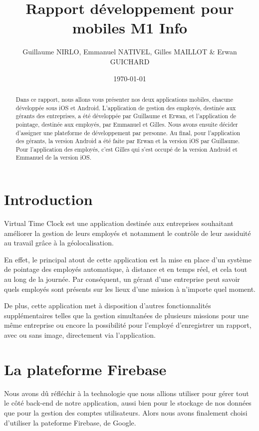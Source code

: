 \documentclass{article}
\title{Rapport développement pour mobiles M1 Info}
\author{Guillaume NIRLO, Emmanuel NATIVEL, Gilles MAILLOT \& Erwan GUICHARD}
\date{\today}
\begin{document}
\maketitle %


\begin{abstract}
  Dans ce rapport, nous allons vous présenter nos deux applications mobiles, chacune développée sous iOS et Android. L'application de gestion des employés, destinée aux gérants des entreprises, a été développée par Guillaume et Erwan, et l'application de pointage, destinée aux employés, par Emmanuel et Gilles. Nous avons ensuite décider d'assigner une plateforme de développement par personne. Au final, pour l'application des gérants, la version Android a été faite par Erwan et la version iOS par Guillaume. Pour l'application des employés, c'est Gilles qui s'est occupé de la version Android et Emmanuel de la version iOS.
\end{abstract}


\section{Introduction}

Virtual Time Clock est une application destinée aux entreprises souhaitant améliorer la gestion de leurs employés et notamment le contrôle de leur assiduité au travail grâce à la géolocalisation.

En effet, le principal atout de cette application est la mise en place d'un système de pointage des employés automatique, à distance et en temps réel, et cela tout au long de la journée. Par conséquent, un gérant d'une entreprise peut savoir quels employés sont présents sur les lieux d'une mission à n'importe quel moment.

De plus, cette application met à disposition d'autres fonctionnalités supplémentaires telles que la gestion simultanées de plusieurs missions pour une même entreprise ou encore la possibilité pour l'employé d'enregistrer un rapport, avec ou sans image, directement via l'application.

\section{La plateforme Firebase \cite{Firebase}}
Nous avons dû réfléchir à la technologie que nous allions utiliser pour gérer tout le côté back-end de notre application, aussi bien pour le stockage de nos données que pour la gestion des comptes utilisateurs. 
Alors nous avons finalement choisi d'utiliser la pateforme Firebase, de Google. 
\end{document}
